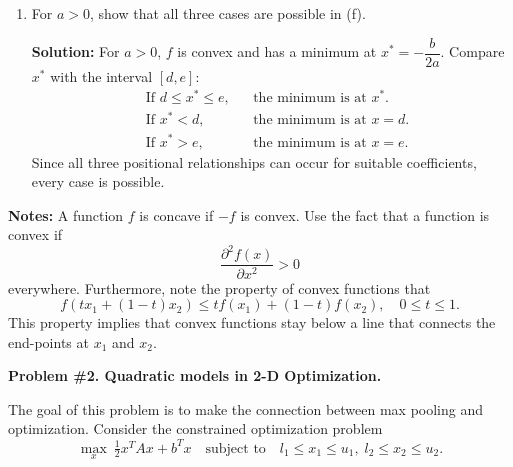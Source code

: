 \documentclass[11pt]{article}
\begin{document}
\begin{enumerate}[label=1(\alph*)]
	\item For $a > 0$, show that all three cases are possible in (f).
	
	\textbf{Solution:}  
	For $a>0$, $f$ is convex and has a minimum at $x^*=-\dfrac{b}{2a}$.  
	Compare $x^*$ with the interval $[d,e]$:
	\[
	\begin{aligned}
		&\text{If } d \le x^* \le e, && \text{the minimum is at } x^*.\\
		&\text{If } x^* < d,        && \text{the minimum is at } x=d.\\
		&\text{If } x^* > e,        && \text{the minimum is at } x=e.
	\end{aligned}
	\]
	Since all three positional relationships can occur for suitable coefficients, every case is possible.
	
	\end{enumerate}
	
	\noindent\textbf{Notes:} A function $f$ is concave if $-f$ is convex. Use the fact that a function is convex if
	\[
	\frac{\partial^{2} f(x)}{\partial x^{2}} > 0
	\]
	everywhere. Furthermore, note the property of convex functions that
	\[
	f(t x_{1} + (1 - t) x_{2}) \le t f(x_{1}) + (1 - t) f(x_{2}), \quad 0 \le t \le 1.
	\]
	This property implies that convex functions stay below a line that connects the end-points at $x_{1}$ and $x_{2}$.

	\textbf{Problem \#2. Quadratic models in 2-D Optimization.}
	
	The goal of this problem is to make the connection between max pooling and optimization.  
	Consider the constrained optimization problem
	\[
	\max_{x} \ \tfrac{1}{2} x^{T} A x + b^{T} x
	\quad \text{subject to} \quad
	l_1 \le x_1 \le u_1,\; l_2 \le x_2 \le u_2.
	\]
	
\end{document}

